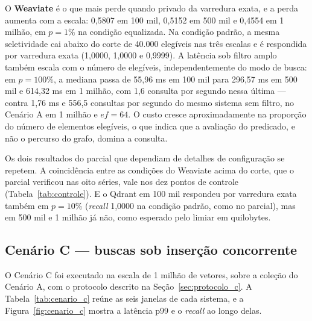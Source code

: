 O \textbf{Weaviate} é o que mais perde quando privado da varredura exata, e a perda aumenta com a escala: 0,5807 em 100 mil, 0,5152 em 500 mil e 0,4554 em 1 milhão, em $p = 1\%$ na condição equalizada. Na condição padrão, a mesma seletividade cai abaixo do corte de 40.000 elegíveis nas três escalas e é respondida por varredura exata (1,0000, 1,0000 e 0,9999). A latência sob filtro amplo também escala com o número de elegíveis, independentemente do modo de busca: em $p = 100\%$, a mediana passa de 55,96 ms em 100 mil para 296,57 ms em 500 mil e 614,32 ms em 1 milhão, com 1,6 consulta por segundo nessa última --- contra 1,76 ms e 556,5 consultas por segundo do mesmo sistema sem filtro, no Cenário A em 1 milhão e $ef = 64$. O custo cresce aproximadamente na proporção do número de elementos elegíveis, o que indica que a avaliação do predicado, e não o percurso do grafo, domina a consulta.

Os dois resultados do parcial que dependiam de detalhes de configuração se repetem. A coincidência entre as condições do Weaviate acima do corte, que o parcial verificou nas oito séries, vale nos dez pontos de controle (Tabela~\ref{tab:controle}). E o Qdrant em 100 mil respondeu por varredura exata também em $p = 10\%$ (\textit{recall} 1,0000 na condição padrão, como no parcial), mas em 500 mil e 1 milhão já não, como esperado pelo limiar em quilobytes.

\subsection{Cenário C --- buscas sob inserção concorrente}

\label{sec:cenario_c}

O Cenário C foi executado na escala de 1 milhão de vetores, sobre a coleção do Cenário A, com o protocolo descrito na Seção~\ref{sec:protocolo_c}. A Tabela~\ref{tab:cenario_c} reúne as seis janelas de cada sistema, e a Figura~\ref{fig:cenario_c} mostra a latência p99 e o \textit{recall} ao longo delas.


